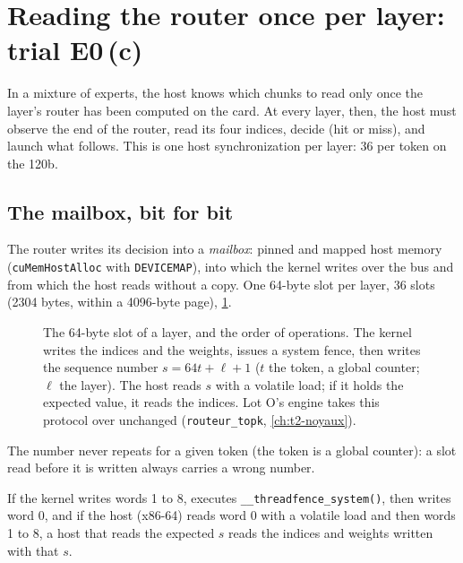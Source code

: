 \section{Reading the router once per layer: trial E0\,(c)}\label{sec:t2c-routeur}

In a mixture of experts, the host knows which chunks to read only once the layer's router has been computed on the card. At every layer, then, the host must observe the end of the router, read its four indices, decide (hit or miss), and launch what follows. This is one host synchronization per layer: 36 per token on the 120b.

\subsection{The mailbox, bit for bit}

The router writes its decision into a \emph{mailbox}: pinned and mapped host memory (\texttt{cuMemHostAlloc} with \texttt{DEVICEMAP}), into which the kernel writes over the bus and from which the host reads without a copy. One 64-byte slot per layer, 36 slots (\num{2304} bytes, within a \num{4096}-byte page), \cref{fig:t2c-boite}.

\begin{figure}[ht]
\centering
\resizebox{\linewidth}{!}{\SchemaChmBoite}
\caption[The mailbox slot of a layer]{The 64-byte slot of a layer, and the order of operations. The kernel writes the indices and the weights, issues a system fence, then writes the sequence number $s = 64t + \ell + 1$ ($t$ the token, a global counter; $\ell$ the layer). The host reads $s$ with a volatile load; if it holds the expected value, it reads the indices. Lot O's engine takes this protocol over unchanged (\texttt{routeur\_topk}, \cref{ch:t2-noyaux}).}
\label{fig:t2c-boite}
\end{figure}

The number never repeats for a given token (the token is a global counter): a slot read before it is written always carries a wrong number.

\begin{proposition}\label{prop:t2c-visibilite}
If the kernel writes words 1 to 8, executes \texttt{\_\_threadfence\_system()}, then writes word 0, and if the host (x86-64) reads word 0 with a volatile load and then words 1 to 8, a host that reads the expected $s$ reads the indices and weights written with that $s$.
\end{proposition}

